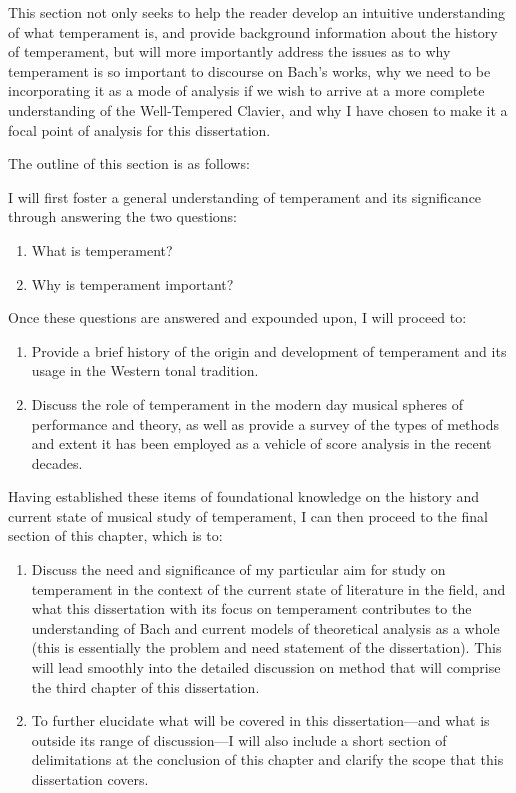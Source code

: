 This section not only seeks to help the reader develop an intuitive
understanding of what temperament is, and provide background information
about the history of temperament, but will more importantly address the
issues as to why temperament is so important to discourse on Bach's
works, why we need to be incorporating it as a mode of analysis if we
wish to arrive at a more complete understanding of the Well-Tempered
Clavier, and why I have chosen to make it a focal point of analysis for
this dissertation.

The outline of this section is as follows:

I will first foster a general understanding of temperament and its
significance through answering the two questions:

\begin{enumerate}
\def\labelenumi{\arabic{enumi}.}
\tightlist
\item
  What is temperament?
\item
  Why is temperament important?
\end{enumerate}

Once these questions are answered and expounded upon, I will proceed to:

\begin{enumerate}
\def\labelenumi{\arabic{enumi}.}
\setcounter{enumi}{2}
\tightlist
\item
  Provide a brief history of the origin and development of temperament
  and its usage in the Western tonal tradition.
\item
  Discuss the role of temperament in the modern day musical spheres of
  performance and theory, as well as provide a survey of the types of
  methods and extent it has been employed as a vehicle of score analysis
  in the recent decades.
\end{enumerate}

Having established these items of foundational knowledge on the history
and current state of musical study of temperament, I can then proceed to
the final section of this chapter, which is to:

\begin{enumerate}
\def\labelenumi{\arabic{enumi}.}
\setcounter{enumi}{4}
\tightlist
\item
  Discuss the need and significance of my particular aim for study on
  temperament in the context of the current state of literature in the
  field, and what this dissertation with its focus on temperament
  contributes to the understanding of Bach and current models of
  theoretical analysis as a whole (this is essentially the problem and
  need statement of the dissertation). This will lead smoothly into the
  detailed discussion on method that will comprise the third chapter of
  this dissertation.
\item
  To further elucidate what will be covered in this dissertation---and
  what is outside its range of discussion---I will also include a short
  section of delimitations at the conclusion of this chapter and clarify
  the scope that this dissertation covers.
\end{enumerate}

